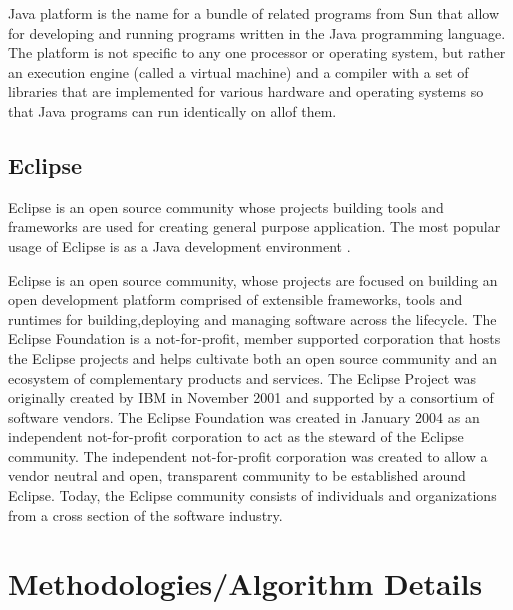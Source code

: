 \documentclass[oneside,a4paper,12pt]{report}
\begin{document}
{ Java platform is the name for a bundle of related programs from Sun that allow for developing and running programs written in the Java programming language. The platform is not specific to any one processor or operating system, but rather an execution engine (called a virtual machine) and a compiler with a set of libraries that are implemented for various hardware and operating systems so that Java programs can run identically on allof them.

 
 \subsection{Eclipse}
 Eclipse is an open source community whose projects building tools and frameworks are used for creating general purpose application. The most popular usage of Eclipse is as a Java development environment .
 
 Eclipse is an open source community, whose projects are focused on building an open development platform comprised of extensible frameworks, tools and runtimes for building,deploying and managing software across the lifecycle. The Eclipse Foundation is a not-for-profit, member supported corporation that hosts the Eclipse projects  and helps cultivate both an open source community and an ecosystem of complementary products and services.
 The Eclipse Project was originally created by IBM in November 2001 and supported by a consortium of software vendors. The Eclipse Foundation was created in January 2004 as an independent not-for-profit corporation to act as the steward of the Eclipse community. The independent not-for-profit corporation was created to allow a vendor neutral and open, transparent community to be established around Eclipse. Today, the Eclipse community consists of individuals and organizations from a cross section of the software industry.

\section{Methodologies/Algorithm Details}

}
\end{document}
